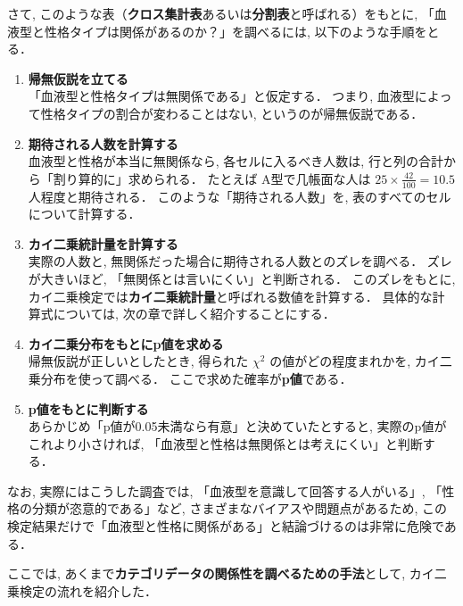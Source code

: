     さて, このような表（\textbf{クロス集計表}あるいは\textbf{分割表}と呼ばれる）をもとに,  
    「血液型と性格タイプは関係があるのか？」を調べるには, 以下のような手順をとる．
    
    \begin{enumerate}
      \item \textbf{帰無仮説を立てる} \\  
        「血液型と性格タイプは無関係である」と仮定する．  
        つまり, 血液型によって性格タイプの割合が変わることはない, というのが帰無仮説である．
    
      \item \textbf{期待される人数を計算する} \\  
        血液型と性格が本当に無関係なら,  
        各セルに入るべき人数は, 行と列の合計から「割り算的に」求められる．  
        たとえば A型で几帳面な人は $25 \times \frac{42}{100} = 10.5$ 人程度と期待される．  
        このような「期待される人数」を, 表のすべてのセルについて計算する．
    
      \item \textbf{カイ二乗統計量を計算する} \\  
        実際の人数と, 無関係だった場合に期待される人数とのズレを調べる．  
        ズレが大きいほど, 「無関係とは言いにくい」と判断される．  
        このズレをもとに, カイ二乗検定では\textbf{カイ二乗統計量}と呼ばれる数値を計算する．  
        具体的な計算式については, 次の章で詳しく紹介することにする．
    
      \item \textbf{カイ二乗分布をもとにp値を求める} \\  
        帰無仮説が正しいとしたとき, 得られた $\chi^2$ の値がどの程度まれかを,  
        カイ二乗分布を使って調べる．  
        ここで求めた確率が\textbf{p値}である．
    
      \item \textbf{p値をもとに判断する} \\  
        あらかじめ「p値が0.05未満なら有意」と決めていたとすると,  
        実際のp値がこれより小さければ,  
        「血液型と性格は無関係とは考えにくい」と判断する．
    \end{enumerate}
    
    なお, 実際にはこうした調査では,  
    「血液型を意識して回答する人がいる」,  
    「性格の分類が恣意的である」など,  
    さまざまなバイアスや問題点があるため,  
    この検定結果だけで「血液型と性格に関係がある」と結論づけるのは非常に危険である．
    
    ここでは, あくまで\textbf{カテゴリデータの関係性を調べるための手法}として,  
    カイ二乗検定の流れを紹介した．


